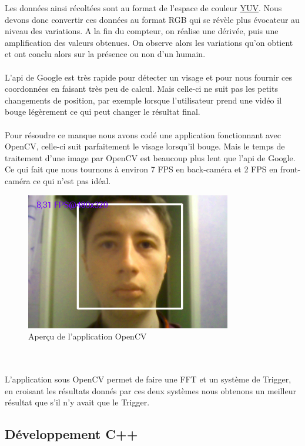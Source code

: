 Les données ainsi récoltées sont au format de l'espace de couleur \href{http://fr.wikipedia.org/wiki/YUV}{YUV}. Nous devons donc convertir ces données au format RGB qui se révèle plus évocateur au niveau des variations.
	A la fin du compteur, on réalise une dérivée, puis une amplification des valeurs obtenues. On observe alors les variations qu'on obtient et ont conclu alors sur la présence ou non d'un humain.
	\\
	\\
	L'api de Google est très rapide pour détecter un visage et pour nous fournir ces coordonnées en faisant très peu de calcul. Mais celle-ci ne suit pas les petits changements de position, par exemple lorsque l'utilisateur prend une vidéo il bouge légèrement ce qui peut changer le résultat final.
	\\
	\\
	Pour résoudre ce manque nous avons codé une application fonctionnant avec OpenCV, celle-ci suit parfaitement le visage lorsqu'il bouge. Mais le temps de traitement d'une image par OpenCV est beaucoup plus lent que l'api de Google. Ce qui fait que nous tournons à environ 7 FPS en back-caméra et 2 FPS en front-caméra ce qui n'est pas idéal.
	\begin{figure}[h!]
			\centering
			\includegraphics[width=0.8\textwidth]{data/opencv.png}
			\caption{Aperçu de l'application OpenCV}
		\end{figure}
	\\
	\\
	L'application sous OpenCV permet de faire une FFT et un système de Trigger, en croisant les résultats donnés par ces deux systèmes nous obtenons un meilleur résultat que s'il n'y avait que le Trigger.

\subsection{Développement C++}

